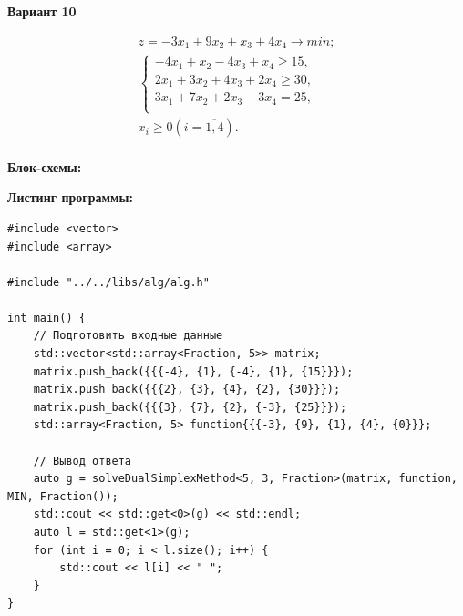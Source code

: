 \documentclass[a4paper,14pt]{extarticle}
\begin{document}
\begin{center}
    \textbf{Вариант 10}
\end{center}
\begin{equation*}
    \begin{aligned}
        z = -3x_1 + 9x_2 + x_3 + 4x_4 \rightarrow min; \\
        \begin{cases}
            -4x_1 + x_2 - 4x_3 + x_4 \geq 15,  \\
            2x_1 + 3x_2 + 4x_3 + 2x_4 \geq 30, \\
            3x_1 + 7x_2 + 2x_3 - 3x_4 = 25,    \\
        \end{cases}             \\
        x_i \geq 0 (i=\overline{1, 4}).
    \end{aligned}
\end{equation*}\\

\textbf{Блок-схемы: }
\begin{center}
    \bigbreak
    \bigbreak
    \bigbreak
\end{center}

\textbf{Листинг программы: }
\begin{verbatim}
#include <vector>
#include <array>

#include "../../libs/alg/alg.h"

int main() {
    // Подготовить входные данные
    std::vector<std::array<Fraction, 5>> matrix;
    matrix.push_back({{{-4}, {1}, {-4}, {1}, {15}}});
    matrix.push_back({{{2}, {3}, {4}, {2}, {30}}});
    matrix.push_back({{{3}, {7}, {2}, {-3}, {25}}});
    std::array<Fraction, 5> function{{{-3}, {9}, {1}, {4}, {0}}};

    // Вывод ответа
    auto g = solveDualSimplexMethod<5, 3, Fraction>(matrix, function, MIN, Fraction());
    std::cout << std::get<0>(g) << std::endl;
    auto l = std::get<1>(g);
    for (int i = 0; i < l.size(); i++) {
        std::cout << l[i] << " ";
    }
}
\end{verbatim}
\end{document}
